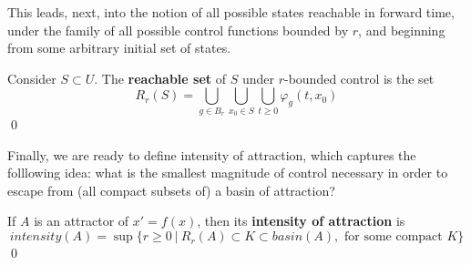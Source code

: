 
This leads, next, into the notion of all possible states reachable in forward time, under the family of all possible control functions bounded by $r$, and beginning from some arbitrary initial set of states.  

\begin{definition}
	Consider $S\subset  U$. The \textbf{reachable set} of $S$ under $r$-bounded control is the set
	$$R_r(S) =  \bigcup\limits_{g \in B_r} \bigcup\limits_{x_0 \in S} \bigcup\limits_{t \geq 0}  \varphi_g(t,x_0)$$ \qed
\end{definition}

Finally, we are ready to define intensity of attraction, which captures the folllowing idea: what is the smallest magnitude of control necessary in order to escape from (all compact subsets of) a basin of attraction? 

\begin{definition}
	If $A$ is an attractor of $x' = f(x)$, then its \textbf{intensity of attraction} is 
	$$intensity(A) = \sup\{ r \geq 0 ~|~ R_r(A) \subset K \subset basin(A), \text{ for some compact }K \}$$ \qed
\end{definition}
	
